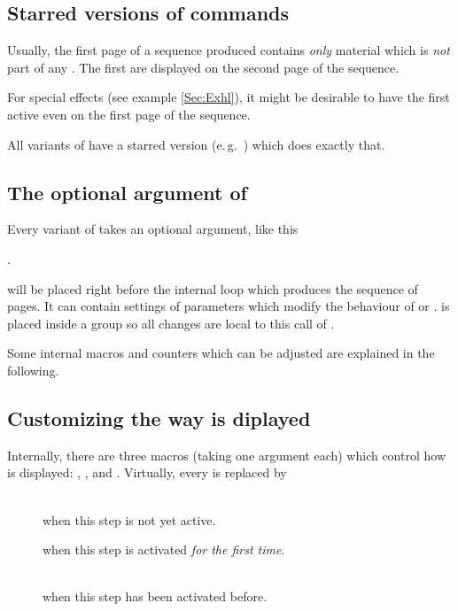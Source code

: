 \documentclass[12pt]{scrartcl}
\let\newslide=\relax
\begin{document}
  \subsection{Starred versions of  commands}\label{Sec:StarredStepwise}%
  Usually, the first page of a sequence produced contains \emph{only} material which is \emph{not} part of any
  . The first  are displayed on the second page of the sequence.

  For special effects (see example \ref{Sec:Exhl}), it might be desirable to have the first  active
  even on the first page of the sequence.

  All variants of   have a starred version (e.\,g.\ ) which does exactly that.

  \newslide

  \subsection{The optional argument of }%
  Every variant of  takes an optional argument, like this
  \begin{center}
    .
  \end{center}
   will be placed right before the internal loop which produces the sequence of pages.  It can
  contain settings of parameters which modify the behaviour of  or . 
  is placed inside a group so all changes are local to this call of .

  Some internal macros and counters which can be adjusted are explained in the following.

  \newslide

  \subsection{Customizing the way  is diplayed}\label{Sec:displaycustom}%
  Internally, there are three macros (taking one argument each) which control how  is displayed:
  ,
  , and
  . Virtually, every
   is replaced by
  \begin{description}
  \item[]\mbox{}\\ when this step is not yet active.
  \item[] when this step is
    activated \emph{for the first time}.
  \item[]\mbox{}\\
    when this step has been activated before.
  \end{description}
\end{document}
